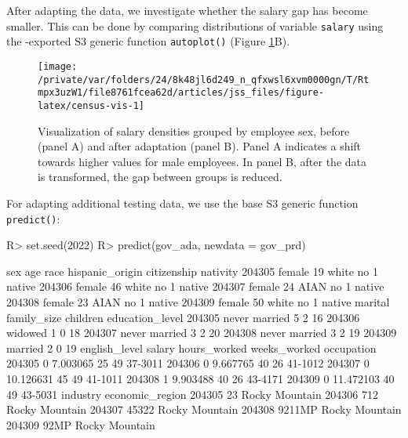 \documentclass[
  nojss]{jss}
\begin{document}
After adapting the data, we investigate whether the salary gap has
become smaller. This can be done by comparing distributions of variable
\texttt{salary} using the -exported S3 generic function
\texttt{autoplot()} (Figure \ref{fig:census-vis}B).

\begin{CodeChunk}
\begin{figure}

{\centering \texttt{[image: /private/var/folders/24/8k48jl6d249\_n\_qfxwsl6xvm0000gn/T/Rtmpx3uzW1/file8761fcea62d/articles/jss\_files/figure-latex/census-vis-1]} 

}

\caption[Visualization of salary densities grouped by employee sex, before (panel A) and after adaptation (panel B)]{Visualization of salary densities grouped by employee sex, before (panel A) and after adaptation (panel B). Panel A indicates a shift towards higher values for male employees. In panel B, after the data is transformed, the gap between groups is reduced.}\label{fig:census-vis}
\end{figure}
\end{CodeChunk}

For adapting additional testing data, we use the base  S3
generic function \texttt{predict()}:

\begin{CodeChunk}
\begin{CodeInput}
R> set.seed(2022)
R> predict(gov_ada, newdata = gov_prd)
\end{CodeInput}
\begin{CodeOutput}
          sex age  race hispanic_origin citizenship nativity
204305 female  19 white              no           1   native
204306 female  46 white              no           1   native
204307 female  24  AIAN              no           1   native
204308 female  23  AIAN              no           1   native
204309 female  50 white              no           1   native
             marital family_size children education_level
204305 never married           5        2              16
204306       widowed           1        0              18
204307 never married           3        2              20
204308 never married           3        2              19
204309       married           2        0              19
       english_level    salary hours_worked weeks_worked occupation
204305             0  7.003065           25           49    37-3011
204306             0  9.667765           40           26    41-1012
204307             0 10.126631           45           49    41-1011
204308             1  9.903488           40           26    43-4171
204309             0 11.472103           40           49    43-5031
       industry economic_region
204305       23  Rocky Mountain
204306      712  Rocky Mountain
204307    45322  Rocky Mountain
204308   9211MP  Rocky Mountain
204309     92MP  Rocky Mountain
\end{CodeOutput}
\end{CodeChunk}
\end{document}
